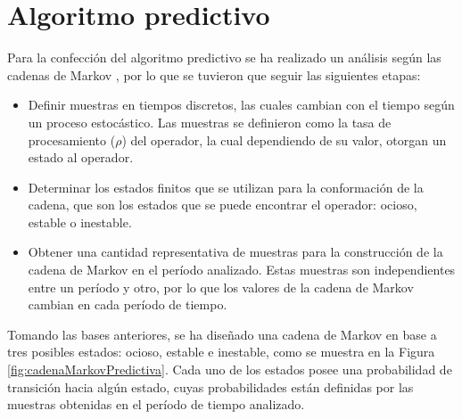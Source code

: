 \section{Algoritmo predictivo}
Para la confecci\'on del algoritmo predictivo se ha realizado un an\'alisis seg\'un las cadenas de Markov \citep{ching2006markov}, por lo que se tuvieron que seguir las siguientes etapas:

\begin{itemize}
	\item Definir muestras en tiempos discretos, las cuales cambian con el tiempo seg\'un un proceso estoc\'astico. Las muestras se definieron como la tasa de procesamiento ($\rho$) del operador, la cual dependiendo de su valor, otorgan un estado al operador.
	\item Determinar los estados finitos que se utilizan para la conformaci\'on de la cadena, que son los estados que se puede encontrar el operador: ocioso, estable o inestable.
	\item Obtener una cantidad representativa de muestras para la construcci\'on de la cadena de Markov en el per\'iodo analizado. Estas muestras son independientes entre un per\'iodo y otro, por lo que los valores de la cadena de Markov cambian en cada per\'iodo de tiempo. %
\end{itemize}

Tomando las bases anteriores, se ha dise\~nado una cadena de Markov en base a tres posibles estados: ocioso, estable e inestable, como se muestra en la Figura \ref{fig:cadenaMarkovPredictiva}. Cada uno de los estados posee una probabilidad de transici\'on hacia alg\'un estado, cuyas probabilidades est\'an definidas por las muestras obtenidas en el per\'iodo de tiempo analizado.

